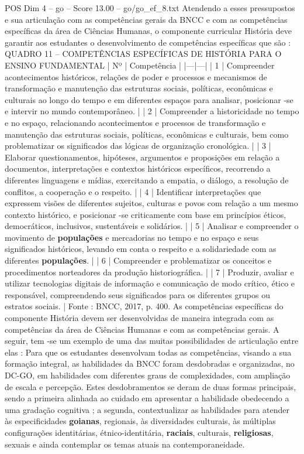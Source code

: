\begin{textsample}{POS Dim 4 – go – Score 13.00 – go/go\_ef\_8.txt}
Atendendo a esses pressupostos e sua articulação com as competências gerais da BNCC e com as competências específicas da área de Ciências Humanas, o componente curricular História deve garantir aos estudantes o desenvolvimento de competências específicas que são : QUADRO 11 – COMPETÊNCIAS ESPECÍFICAS DE HISTÓRIA PARA O ENSINO FUNDAMENTAL | Nº | Competência | |---|---| | 1 | Compreender acontecimentos históricos, relações de poder e processos e mecanismos de transformação e manutenção das estruturas sociais, políticas, econômicas e culturais ao longo do tempo e em diferentes espaços para analisar, posicionar -se e intervir no mundo contemporâneo. | | 2 | Compreender a historicidade no tempo e no espaço, relacionando acontecimentos e processos de transformação e manutenção das estruturas sociais, políticas, econômicas e culturais, bem como problematizar os significados das lógicas de organização cronológica. | | 3 | Elaborar questionamentos, hipóteses, argumentos e proposições em relação a documentos, interpretações e contextos históricos específicos, recorrendo a diferentes linguagens e mídias, exercitando a empatia, o diálogo, a resolução de conflitos, a cooperação e o respeito. | | 4 | Identificar interpretações que expressem visões de diferentes sujeitos, culturas e povos com relação a um mesmo contexto histórico, e posicionar -se criticamente com base em princípios éticos, democráticos, inclusivos, sustentáveis e solidários. | | 5 | Analisar e compreender o movimento de \textbf{populações} e mercadorias no tempo e no espaço e seus significados históricos, levando em conta o respeito e a solidariedade com as diferentes \textbf{populações}. | | 6 | Compreender e problematizar os conceitos e procedimentos norteadores da produção historiográfica. | | 7 | Produzir, avaliar e utilizar tecnologias digitais de informação e comunicação de modo crítico, ético e responsável, compreendendo seus significados para os diferentes grupos ou estratos sociais. | Fonte : BNCC, 2017, p. 400.
As competências específicas do componente História devem ser desenvolvidas de maneira integrada com as competências da área de Ciências Humanas e com as competências gerais.
A seguir, tem -se um exemplo de uma das muitas possibilidades de articulação entre elas : Para que os estudantes desenvolvam todas as competências, visando a sua formação integral, as habilidades da BNCC foram desdobradas e organizadas, no DC-GO, em habilidades com diferentes graus de complexidades, com ampliação de escala e percepção.
Estes desdobramentos se deram de duas formas principais, sendo a primeira alinhada ao cuidado em apresentar a habilidade obedecendo a uma gradação cognitiva ; a segunda, contextualizar as habilidades para atender às especificidades \textbf{goianas}, regionais, às diversidades culturais, às múltiplas configurações identitárias, étnico-identitária, \textbf{raciais}, culturais, \textbf{religiosas}, sexuais e ainda contemplar os temas atuais na contemporaneidade.

\end{textsample}
